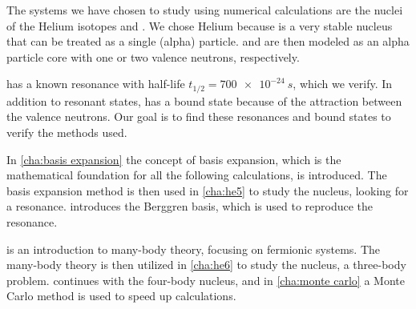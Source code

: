 The systems we have chosen to study using numerical calculations
are the nuclei of the  Helium isotopes  and . We chose Helium  
because  is a very stable nucleus that can be treated 
as a single (alpha) particle.  and  are then modeled
as an alpha particle core with one or two valence neutrons, 
respectively. 

 has a known resonance with half-life $t_{1/2} = \SI{700e-24}{s}$,
which we verify. In addition to resonant states,  has a bound state because of the attraction between the valence neutrons. Our goal is to find these resonances and bound states to verify the methods used.




In \cref{cha:basis expansion} the concept of 
basis expansion, which is the mathematical foundation for all the
following calculations, is introduced. The basis expansion method is then used in 
\cref{cha:he5} to study the  nucleus, looking for a resonance.
 introduces the Berggren basis, which
is used to reproduce the resonance.


 is an introduction to many-body theory, focusing 
on fermionic systems. The many-body theory is then utilized in \cref{cha:he6} 
to study the  nucleus, a three-body problem. 
continues with the four-body  nucleus, and in \cref{cha:monte carlo}
a Monte Carlo method is used to speed up calculations.
